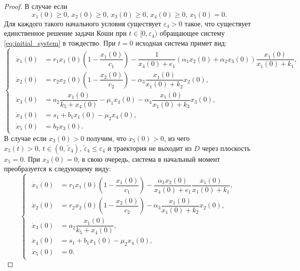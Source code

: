 \documentclass[14pt,a4paper]{extarticle}
\begin{document}
\begin{proof}
		В случае если 
		\begin{equation}\label{eq:conds_4}
			x_1(0)\ge0,\, x_2(0)\ge0,\, x_3(0)\ge0,\, x_4(0)\ge0,\, x_5(0)=0.
		\end{equation}
		Для каждого такого начального условия существует $\varepsilon_4>0$ такое, что существует единственное решение задачи Коши при $t\in[0,\varepsilon_4)$ обращающее систему \ref{eq:initial_system} в тождество. При $t=0$ исходная система примет вид:
		\begin{equation*}
			\begin{cases}
				\begin{aligned}
					\dot{x}_1(0) &= r_1x_1(0)\left(1-\dfrac{x_1(0)}{c_1}\right)-\dfrac{1}{x_4(0)+e_1}(\alpha_1x_2(0)+\alpha_2x_3(0))\dfrac{x_1(0)}{x_1(0)+k_1},\\
					\dot{x}_2(0) &= r_2x_2(0)\left(1-\dfrac{x_2(0)}{c_2}\right)-\alpha_3\dfrac{x_1(0)}{x_1(0)+k_2}x_2(0),\\
					\dot{x}_3(0) &= a_2\dfrac{x_1(0)}{k_5+x_4(0)}-\mu_1x_3(0)-\alpha_4\dfrac{x_1(0)}{x_1(0)+k_3}x_3(0),\\
					\dot{x}_4(0) &= s_1 + b_1x_1(0)-\mu_2x_4(0),\\
					\dot{x}_5(0) &= b_2x_3(0).
				\end{aligned}
			\end{cases}
		\end{equation*}
		В случае если $x_3(0)>0$ получим, что $\dot{x}_5(0)>0$, из чего $x_5(t)>0,\, t\in(0,\, \tilde{\varepsilon}_4),\,\tilde{\varepsilon}_4\le\varepsilon_4$ и траектория не выходит из $D$ через плоскость $x_5=0$. При $x_3(0)=0$, в свою очередь, система в начальный момент преобразуется к следующему виду:
		\begin{equation*}
			\begin{cases}
				\begin{aligned}
					\dot{x}_1(0) &= r_1x_1(0)\left(1-\dfrac{x_1(0)}{c_1}\right)-\dfrac{\alpha_1x_2(0)}{x_4(0)+e_1}\dfrac{x_1(0)}{x_1(0)+k_1},\\
					\dot{x}_2(0) &= r_2x_2(0)\left(1-\dfrac{x_2(0)}{c_2}\right)-\alpha_3\dfrac{x_1(0)}{x_1(0)+k_2}x_2(0),\\
					\dot{x}_3(0) &= a_2\dfrac{x_1(0)}{k_5+x_4(0)},\\
					\dot{x}_4(0) &= s_1 + b_1x_1(0)-\mu_2x_4(0),\\
					\dot{x}_5(0) &= 0.
				\end{aligned}
			\end{cases}
		\end{equation*} 

\end{proof}
\end{document}
